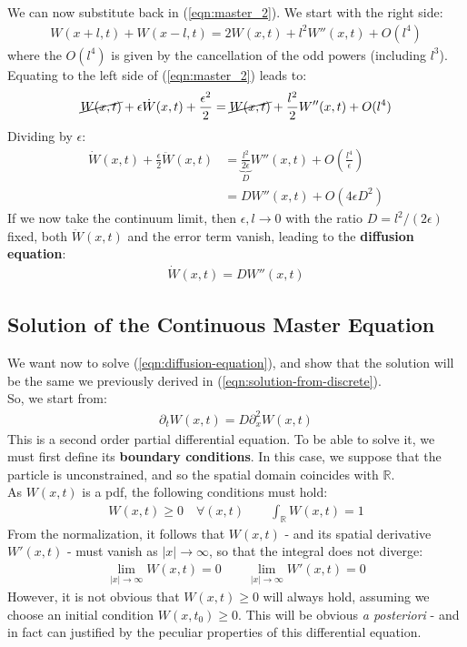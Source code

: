 \documentclass[../template.tex]{subfiles}
\begin{document}
We can now substitute back in (\ref{eqn:master_2}). We start with the right side:
\begin{align*}
    W(x+l,t) + W(x-l, t) = 2 W(x,t) + l^2 W''(x,t) + O(l^4)
\end{align*}
where the $O(l^4)$ is given by the cancellation of the odd powers (including $l^3$). Equating to the left side of (\ref{eqn:master_2}) leads to:  
\begin{align*}
    \cancel{W(x,t)}+ \epsilon \dot{W}(x,t) + \frac{\epsilon^2}{2} = \cancel{W(x,t)} + \frac{l^2}{2} W''(x,t) + O(l^4)  
\end{align*}
Dividing by $\epsilon$:
\begin{align*}
    \dot{W}(x,t) + \frac{\epsilon}{2} \ddot{W}(x,t) &= \underbrace{\frac{l^2}{2 \epsilon}}_{D}  W''(x,t) + O\left(\frac{l^4}{\epsilon} \right)  \\
    &= D W''(x,t) + O(4 \epsilon D^2)
\end{align*} 
If we now take the continuum limit, then $\epsilon, l \to 0$ with the ratio $D = l^2/(2\epsilon)$ fixed, both $\ddot{W}(x,t)$ and the error term vanish, leading to the \textbf{diffusion equation}: 
\begin{align}
    \dot{W}(x,t) = D W''(x,t)
    \label{eqn:diffusion-equation}
\end{align}  

\subsection{Solution of the Continuous Master Equation}
We want now to solve (\ref{eqn:diffusion-equation}), and show that the solution will be the same we previously derived in (\ref{eqn:solution-from-discrete}).\\
So, we start from:
\begin{align*}
    \partial_t W(x,t) = D \partial_x^2 W(x,t)
\end{align*}
This is a second order partial differential equation. To be able to solve it, we must first define its \textbf{boundary conditions}. In this case, we suppose that the particle is unconstrained, and so the spatial domain coincides with $\mathbb{R}$.\\
As $W(x,t)$ is a pdf, the following conditions must hold:
\begin{align*}
    W(x,t) \geq 0 \quad \forall (x,t) \qquad \int_{\mathbb{R}} W(x,t) = 1
\end{align*}   
From the normalization, it follows that $W(x,t)$ - and its spatial derivative $W'(x,t)$ - must vanish as $|x| \to \infty$, so that the integral does not diverge:
\begin{align}
    \lim_{|x| \to \infty} W(x,t) = 0 \qquad \lim_{|x| \to \infty} W'(x,t) = 0
    \label{eqn:boundary-conditions}
\end{align}   
However, it is not obvious that $W(x,t) \geq 0$ will always hold, assuming we choose an initial condition $W(x,t_0) \geq 0$. This will be obvious \textit{a posteriori} - and in fact can justified by the peculiar properties of this differential equation.\\
\end{document}
